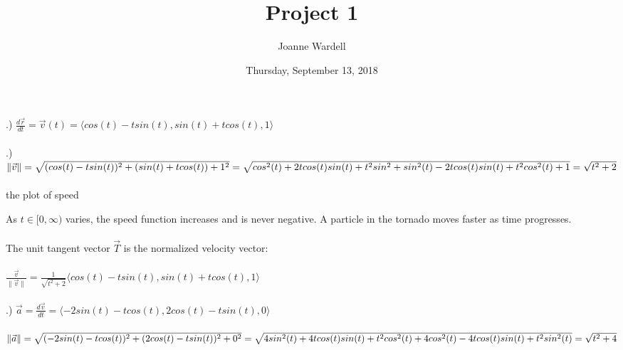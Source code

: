 \documentclass[12pt]{article}
\title{\vspace{-2.0cm}Project 1}
\author{Joanne Wardell}
\date{Thursday, September 13, 2018}
\begin{document}
\maketitle
{}.) $\frac{d\vec{r}}{dt} = \vec{v}(t) = \langle cos(t) -tsin(t), sin(t) + tcos(t), 1\rangle$\\\\
.) $\| \vec{v}\|  = \sqrt{(cos(t) - tsin(t))^{2} + (sin(t) + tcos(t)) + 1^{2}}
\\\\= \sqrt{cos^{2}(t) + 2tcos(t)sin(t) + t^{2}sin^{2} + sin^{2}(t) -2tcos(t)sin(t) + t^{2}cos^{2}(t) + 1} 
\\\\ = \sqrt{t^{2} + 2}$\\\\
\noindent the plot of speed\\



\noindent As $t \in [0, \infty)$ varies, the speed function increases and is never negative.
A particle in the tornado moves faster as time progresses.\\\\
\noindent The unit tangent vector $\vec{T}$ is the normalized velocity vector:\\\\
$\frac{\vec{v}}{\| \vec{v} \|} = \frac{1}{\sqrt{t^{2}+ 2}}\langle cos(t) -tsin(t), sin(t) + tcos(t), 1\rangle$\\\\
.) $\vec{a} = \frac{d\vec{v}}{dt} = \langle - 2sin(t) -tcos(t), 2cos(t) - tsin(t), 0\rangle$\\\\
\noindent $\| \vec{a} \| = \sqrt{(-2sin(t)-tcos(t))^{2} + (2cos(t) - tsin(t))^{2} + 0^{2}} \\\\= 
\sqrt{4sin^{2}(t)+4tcos(t)sin(t)+t^{2}cos^{2}(t) + 4cos^{2}(t)-4tcos(t)sin(t)+t^{2}sin^{2}(t)} \\\\= \sqrt{t^{2} + 4}$\clearpage
\end{document}
